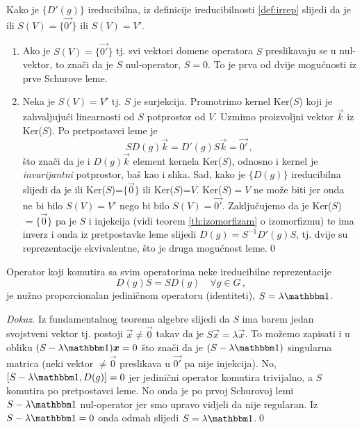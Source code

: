 Kako je $\{D'(g)\}$ ireducibilna, iz
definicije ireducibilnosti \ref{def:irrep} slijedi
da je ili $S(V)=\{\vec{0'}\}$ ili $S(V)=V'$.

\begin{enumerate}
\item Ako je $S(V)=\{\vec{0'}\}$ tj. svi vektori domene operatora $S$
    preslikavaju se u nul-vektor, to znači da je $S$ nul-operator,  $S=0$.
    To je prva od dvije mogućnosti iz prve Schurove leme.

\item Neka je $S(V)=V'$ tj. $S$ je surjekcija. Promotrimo 
    kernel Ker($S$) koji je zahvaljujući linearnosti od $S$
    potprostor od $V$.
    Uzmimo proizvoljni vektor $\vec{k}$ iz Ker($S$).
    Po pretpostavci leme je 
    $$ S D(g) \vec{k} = D'(g)S\vec{k} = \vec{0'} \,,$$
    što znači da je i $D(g)\vec{k}$ element kernela Ker($S$), odnosno
    i kernel je \emph{invarijantni} potprostor, baš kao i slika.
    Sad, kako je $\{D(g)\}$ ireducibilna slijedi da je ili
    Ker($S$)=$\{\vec{0}\}$ ili Ker($S$)=$V$.
    Ker($S$)$=V$ ne može biti jer onda ne bi bilo $S(V)=V'$ nego bi bilo
      $S(V)=\vec{0'}$.
    Zaključujemo da je Ker($S$)$=\{\vec{0}\}$ pa je $S$ i injekcija (vidi
    teorem \ref{th:izomorfizam} o izomorfizmu) te ima inverz
    i onda iz pretpostavke leme slijedi $D(g)=S^{-1}D'(g)S$, tj.
    dvije su reprezentacije ekvivalentne, što je druga mogućnost leme.\qed 
\end{enumerate}

\begin{teorem}
Operator koji komutira sa svim operatorima neke ireducibilne 
reprezentacije
\begin{displaymath}
  D(g)S=SD(g) \quad \forall g\in G \,,
\end{displaymath}
je nužno proporcionalan jediničnom operatoru
(identiteti), $S = \lambda \Eins$.
\end{teorem}

\emph{Dokaz.} Iz fundamentalnog teorema algebre slijedi da $S$ ima
barem jedan svojstveni vektor tj. postoji
$\vec{x}\neq\vec{0}$ takav da je $S\vec{x}=\lambda\vec{x}$.
To možemo zapisati i u obliku $(S-\lambda\Eins)\vec{x}=0$ što
znači da je $(S-\lambda\Eins)$
singularna matrica (neki vektor $\neq \vec{0}$ preslikava u
$\vec{0'}$ pa nije injekcija).
No, $[S-\lambda\Eins, D(g)]=0$
jer jedinični operator komutira trivijalno, a $S$ komutira po pretpostavci leme.
No onda je po prvoj Schurovoj lemi $S-\lambda\Eins$ nul-operator jer smo upravo vidjeli
da nije regularan. Iz $S-\lambda\Eins=0$ onda odmah slijedi $S=\lambda\Eins$.\qed



